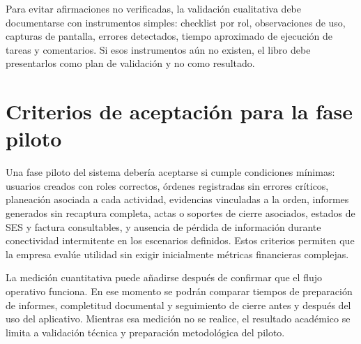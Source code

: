 Para evitar afirmaciones no verificadas, la validación cualitativa debe documentarse con instrumentos simples: checklist por rol, observaciones de uso, capturas de pantalla, errores detectados, tiempo aproximado de ejecución de tareas y comentarios. Si esos instrumentos aún no existen, el libro debe presentarlos como plan de validación y no como resultado.

\section{Criterios de aceptación para la fase piloto}
\label{sec:criterios-aceptacion-piloto}

Una fase piloto del sistema debería aceptarse si cumple condiciones mínimas: usuarios creados con roles correctos, órdenes registradas sin errores críticos, planeación asociada a cada actividad, evidencias vinculadas a la orden, informes generados sin recaptura completa, actas o soportes de cierre asociados, estados de SES y factura consultables, y ausencia de pérdida de información durante conectividad intermitente en los escenarios definidos. Estos criterios permiten que la empresa evalúe utilidad sin exigir inicialmente métricas financieras complejas.

La medición cuantitativa puede añadirse después de confirmar que el flujo operativo funciona. En ese momento se podrán comparar tiempos de preparación de informes, completitud documental y seguimiento de cierre antes y después del uso del aplicativo. Mientras esa medición no se realice, el resultado académico se limita a validación técnica y preparación metodológica del piloto.
